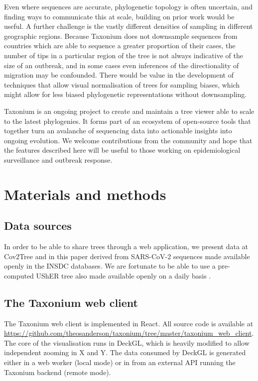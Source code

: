Even where sequences are accurate, phylogenetic topology is often uncertain, and finding ways to communicate this at scale, building on prior work \citep{densitree} would be useful. A further challenge is the vastly different densities of sampling in different geographic regions. Because Taxonium does not downsample sequences from countries which are able to sequence a greater proportion of their cases, the number of tips in a particular region of the tree is not always indicative of the size of an outbreak, and in some cases even inferences of the directionality of migration may be confounded. There would be value in the development of techniques that allow visual normalisation of trees for sampling biases, which might allow for less biased phylogenetic representations without downsampling.

Taxonium is an ongoing project to create and maintain a tree viewer able to scale to the latest phylogenies. It forms part of an ecosystem of open-source tools that together turn an avalanche of sequencing data into actionable insights into ongoing  evolution. We welcome contributions from the community and hope that the features described here will be useful to those working on epidemiological surveillance and outbreak response.

\clearpage{}
\section*{Materials and methods}

\subsection*{Data sources}
In order to be able to share trees through a web application, we present data at Cov2Tree and in this paper derived from SARS-CoV-2 sequences made available openly in the INSDC databases. We are fortunate to be able to use a pre-computed UShER tree also made available openly on a daily basis \citep{McBroome2021}.

\subsection*{The Taxonium web client}
The Taxonium web client is implemented in React. All source code is available at \url{https://github.com/theosanderson/taxonium/tree/master/taxonium_web_client}. The core of the visualisation runs in DeckGL, which is heavily modified to allow independent zooming in X and Y. The data consumed by DeckGL is generated either in a web worker (local mode) or in from an external API running the Taxonium backend (remote mode).

